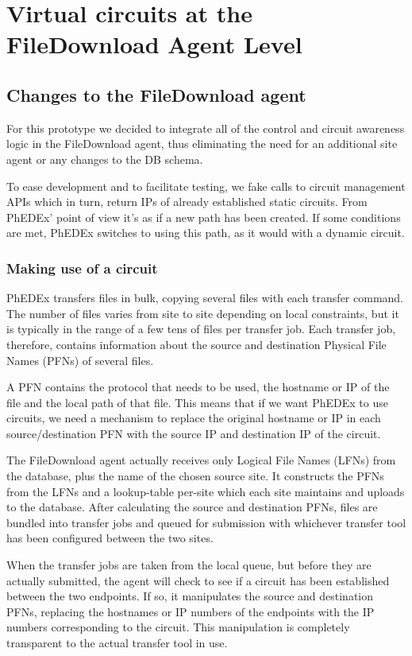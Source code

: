 \section{Virtual circuits at the FileDownload Agent Level}

\subsection{Changes to the FileDownload agent}

For this prototype we decided to integrate all of the control and circuit awareness
logic in the FileDownload agent, thus eliminating the need for an additional site 
agent or any changes to the DB schema. 

To ease development and to facilitate testing, we fake calls to circuit management APIs
which in turn, return IPs of already established static circuits. From PhEDEx'
point of view it's as if a new path has been created. If some conditions are
met, PhEDEx switches to using this path, as it would with a dynamic circuit.

\subsubsection{Making use of a circuit}

PhEDEx transfers files in bulk, copying several files with each transfer command. The number of files varies from
site to site depending on local constraints, but it is typically in the range of a few tens of files per transfer job. Each transfer job, therefore, contains information about the source and destination Physical File Names (PFNs) of several files.

A PFN contains the protocol that needs to be used, the hostname or IP of the file
and the local path of that file. This means that if we want PhEDEx to use
circuits, we need a mechanism to replace the original hostname or IP in each 
source/destination PFN with the source IP and destination IP of the circuit.

The FileDownload agent actually receives only Logical File Names (LFNs) from the database, plus the name of the chosen source site. It constructs the PFNs from the LFNs and a lookup-table per-site which each site maintains and uploads to the database. After calculating the source and destination PFNs, files are bundled into transfer jobs and queued for submission with whichever transfer tool has been configured between the two sites.

When the transfer jobs are taken from the local queue, but before they are actually submitted, the agent will check to see if a circuit has been established between the two endpoints. If so, it manipulates the source and destination PFNs, replacing the hostnames or IP numbers of the endpoints with the IP numbers corresponding to the circuit. This manipulation is completely transparent to the actual transfer tool in use.

